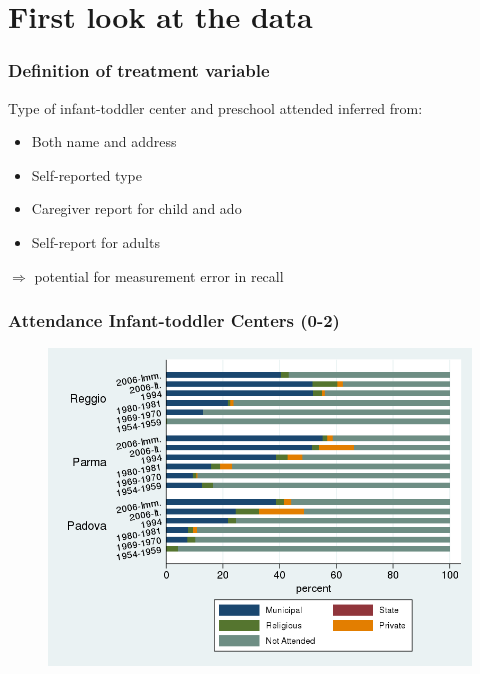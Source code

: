 \documentclass[xcolor=table]{beamer}
\begin{document}
\section{First look at the data}
\begin{frame}

\end{frame}
\begin{frame}
\frametitle{Definition of treatment variable}\label{frame:treatment}
Type of infant-toddler center and preschool attended inferred from:
\begin{itemize}
	\item Both name and address \hyperlink{fig:ReggioSchools}{}
	\item Self-reported type
	\vspace{2ex}
	\item Caregiver report for child and ado
	\item Self-report for adults
\end{itemize}

\vspace{1ex}

$\Rightarrow$ potential for measurement error in recall
\end{frame}
\begin{frame}
\frametitle{Attendance Infant-toddler Centers (0-2)} 
\begin{center}
\begin{figure}
\includegraphics[width=1.15\textheight]{asiloType-Attend.png}
\end{figure}
\end{center}
\end{frame}
\end{document}
